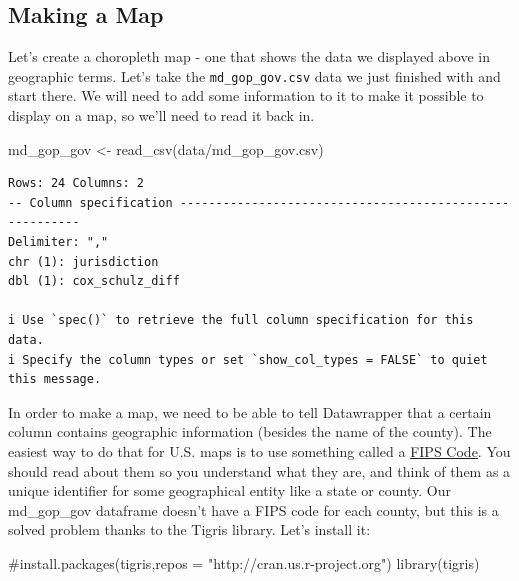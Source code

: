 \documentclass[
  letterpaper,
  DIV=11,
  numbers=noendperiod]{scrreprt}
\newenvironment{Shaded}{\begin{snugshade}}{\end{snugshade}}
\newcommand{\CommentTok}[1]{\textcolor[rgb]{0.37,0.37,0.37}{#1}}
\newcommand{\FunctionTok}[1]{\textcolor[rgb]{0.28,0.35,0.67}{#1}}
\newcommand{\NormalTok}[1]{\textcolor[rgb]{0.00,0.23,0.31}{#1}}
\newcommand{\OtherTok}[1]{\textcolor[rgb]{0.00,0.23,0.31}{#1}}
\newcommand{\StringTok}[1]{\textcolor[rgb]{0.13,0.47,0.30}{#1}}
\begin{document}
\hypertarget{making-a-map}{%
\subsection{Making a Map}\label{making-a-map}}

Let's create a choropleth map - one that shows the data we displayed
above in geographic terms. Let's take the \texttt{md\_gop\_gov.csv} data
we just finished with and start there. We will need to add some
information to it to make it possible to display on a map, so we'll need
to read it back in.

\begin{Shaded}
\begin{Highlighting}[]
\NormalTok{md\_gop\_gov }\OtherTok{\textless{}{-}} \FunctionTok{read\_csv}\NormalTok{(}\StringTok{\textquotesingle{}data/md\_gop\_gov.csv\textquotesingle{}}\NormalTok{)}
\end{Highlighting}
\end{Shaded}

\begin{verbatim}
Rows: 24 Columns: 2
-- Column specification --------------------------------------------------------
Delimiter: ","
chr (1): jurisdiction
dbl (1): cox_schulz_diff

i Use `spec()` to retrieve the full column specification for this data.
i Specify the column types or set `show_col_types = FALSE` to quiet this message.
\end{verbatim}

In order to make a map, we need to be able to tell Datawrapper that a
certain column contains geographic information (besides the name of the
county). The easiest way to do that for U.S. maps is to use something
called a
\href{https://www.census.gov/programs-surveys/geography/guidance/geo-identifiers.html}{FIPS
Code}. You should read about them so you understand what they are, and
think of them as a unique identifier for some geographical entity like a
state or county. Our md\_gop\_gov dataframe doesn't have a FIPS code for
each county, but this is a solved problem thanks to the Tigris library.
Let's install it:

\begin{Shaded}
\begin{Highlighting}[]
\CommentTok{\#install.packages(\textquotesingle{}tigris\textquotesingle{},repos = "http://cran.us.r{-}project.org")}
\FunctionTok{library}\NormalTok{(tigris)}
\end{Highlighting}
\end{Shaded}
\end{document}
